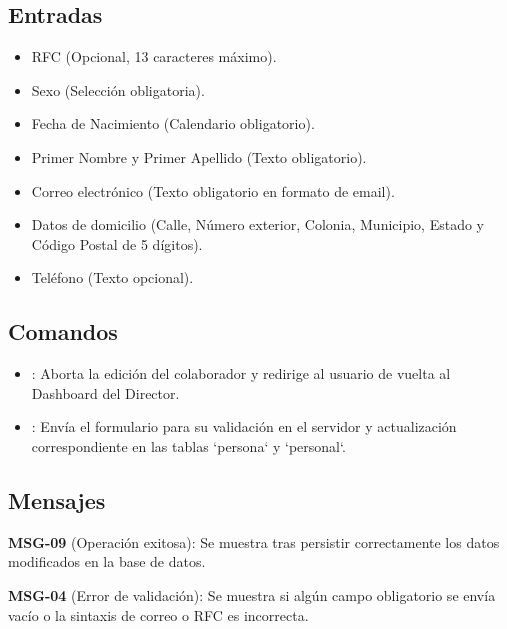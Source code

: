 \subsection{Entradas}
	\begin{itemize}
		\item RFC (Opcional, 13 caracteres máximo).
		\item Sexo (Selección obligatoria).
		\item Fecha de Nacimiento (Calendario obligatorio).
		\item Primer Nombre y Primer Apellido (Texto obligatorio).
		\item Correo electrónico (Texto obligatorio en formato de email).
		\item Datos de domicilio (Calle, Número exterior, Colonia, Municipio, Estado y Código Postal de 5 dígitos).
		\item Teléfono (Texto opcional).
	\end{itemize}

\subsection{Comandos}
	\begin{itemize}
		\item {}: Aborta la edición del colaborador y redirige al usuario de vuelta al Dashboard del Director.
		\item {}: Envía el formulario para su validación en el servidor y actualización correspondiente en las tablas `persona` y `personal`.
	\end{itemize}

\subsection{Mensajes}
	\begin{Citemize}
		\item {\bf MSG-09} (Operación exitosa): Se muestra tras persistir correctamente los datos modificados en la base de datos.
		\item {\bf MSG-04} (Error de validación): Se muestra si algún campo obligatorio se envía vacío o la sintaxis de correo o RFC es incorrecta.
	\end{Citemize}
